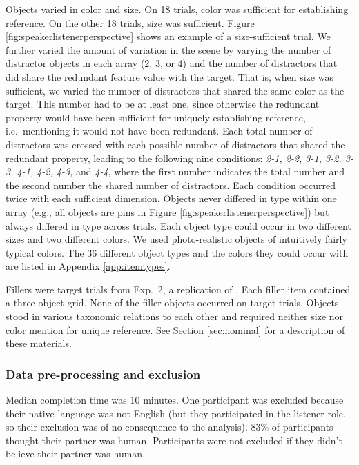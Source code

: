 \documentclass[11pt]{article}
\newcommand{\figref}[1]{Figure \ref{#1}}
\newcommand{\appref}[1]{Appendix \ref{#1}}
\newcommand{\sectionref}[1]{Section \ref{#1}}
\begin{document}
Objects varied in color and size. On 18 trials, color was sufficient for establishing reference. On the other 18 trials, size was sufficient. \figref{fig:speakerlistenerperspective} shows an example of a size-sufficient trial. We further varied the amount of variation in the scene by varying the number of distractor objects in each array (2, 3, or  4) and the number of distractors that did share the redundant feature value with the target. That is, when size was sufficient, we varied the number of distractors that shared the same color as the target. This number had to be at least one, since otherwise the redundant property would have been sufficient for uniquely establishing reference, i.e.~mentioning it would not have been redundant. Each total number of distractors was crossed with each possible number of distractors that shared the redundant property, leading to the following nine conditions: \emph{2-1, 2-2, 3-1, 3-2, 3-3, 4-1, 4-2, 4-3,} and \emph{4-4}, where the first number indicates the total number and the second number the shared number of distractors. Each condition occurred twice with each sufficient dimension. Objects never differed in type within one array (e.g., all objects are pins in \figref{fig:speakerlistenerperspective}) but always differed in type across trials. Each object type could occur in two different sizes and two different colors. We used photo-realistic objects of intuitively fairly typical colors. The 36 different object types and the colors they could occur with are listed in \appref{app:itemtypes}. 


Fillers were target trials from Exp.~2, a replication of . Each filler item contained a three-object grid. None of the filler objects occurred on target trials. Objects stood in various taxonomic relations to each other and required neither size nor color mention for unique reference. See \sectionref{sec:nominal} for a description of these materials.

\subsubsection{Data pre-processing and exclusion}

Median completion time was 10 minutes. One participant was excluded because their native language was not English (but they participated in the listener role, so their exclusion was of no consequence to the analysis). 83\% of participants thought their partner was human. Participants were not excluded if they didn't believe their partner was human.
\end{document}
